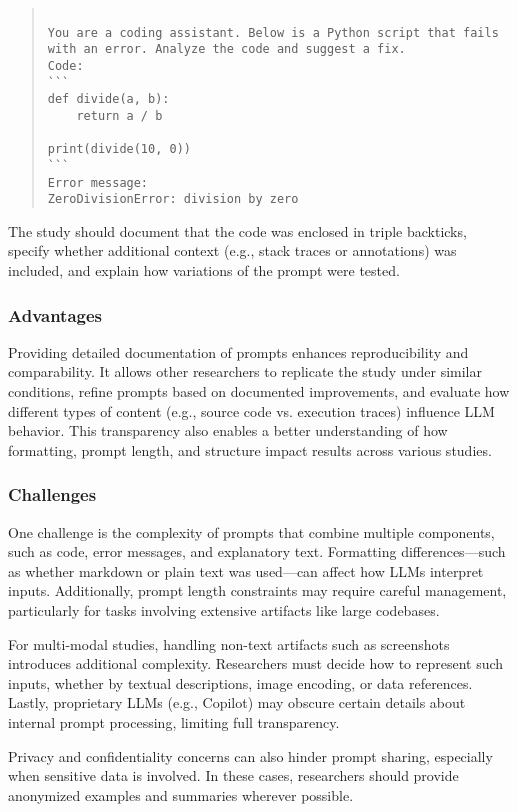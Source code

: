 \documentclass[11pt]{article}
\begin{document}
\begin{quote}
\begin{verbatim}

You are a coding assistant. Below is a Python script that fails with an error. Analyze the code and suggest a fix.
Code:
```
def divide(a, b):
    return a / b

print(divide(10, 0))
```
Error message:
ZeroDivisionError: division by zero

\end{verbatim}
\end{quote}

The study should document that the code was enclosed in triple backticks, specify whether additional context (e.g., stack traces or annotations) was included, and explain how variations of the prompt were tested.

\subsubsection{Advantages}
Providing detailed documentation of prompts enhances reproducibility and comparability. It allows other researchers to replicate the study under similar conditions, refine prompts based on documented improvements, and evaluate how different types of content (e.g., source code vs. execution traces) influence LLM behavior. This transparency also enables a better understanding of how formatting, prompt length, and structure impact results across various studies.

\subsubsection{Challenges}
One challenge is the complexity of prompts that combine multiple components, such as code, error messages, and explanatory text. Formatting differences—such as whether markdown or plain text was used—can affect how LLMs interpret inputs. Additionally, prompt length constraints may require careful management, particularly for tasks involving extensive artifacts like large codebases.

For multi-modal studies, handling non-text artifacts such as screenshots introduces additional complexity. Researchers must decide how to represent such inputs, whether by textual descriptions, image encoding, or data references. Lastly, proprietary LLMs (e.g., Copilot) may obscure certain details about internal prompt processing, limiting full transparency.

Privacy and confidentiality concerns can also hinder prompt sharing, especially when sensitive data is involved. In these cases, researchers should provide anonymized examples and summaries wherever possible.
\end{document}

